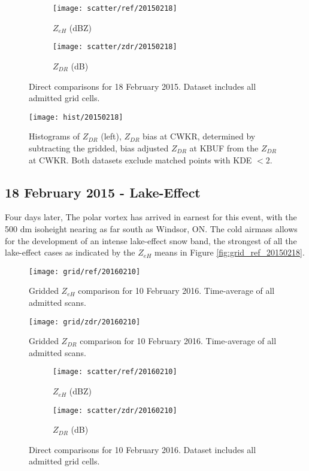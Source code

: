 \begin{figure}[p]
\centering
   \begin{subfigure}{0.49\linewidth} \centering
     \texttt{[image: scatter/ref/20150218]}
     \caption{$Z_{eH}$ (dBZ)}\label{fig:scatter_ref_20150218}
   \end{subfigure}
   \begin{subfigure}{0.49\linewidth} \centering
     \texttt{[image: scatter/zdr/20150218]}
     \caption{$Z_{DR}$ (dB)}\label{fig:scatter_zdr_20150218}
   \end{subfigure}
\caption{Direct comparisons for 18 February 2015. Dataset includes all admitted grid cells.} \label{fig:scatter_20150218}
\end{figure}

\begin{figure}[p]
\texttt{[image: hist/20150218]}\centering
\caption{Histograms of $Z_{DR}$ (left), $Z_{DR}$ bias at CWKR, determined by subtracting the gridded, bias adjusted $Z_{DR}$ at KBUF from the $Z_{DR}$ at CWKR. Both datasets exclude matched points with KDE $< 2$. } 
\label{fig:hist_20150218}
\end{figure}

\subsection{18 February 2015 - Lake-Effect}
Four days later, The polar vortex has arrived in earnest for this event, with the 500 dm isoheight nearing as far south as Windsor, ON. The cold airmass allows for the development of an intense lake-effect snow band, the strongest of all the lake-effect cases as indicated by the $Z_{eH}$ means in Figure \ref{fig:grid_ref_20150218}. 
\begin{figure}[p]
\texttt{[image: grid/ref/20160210]}
\caption{Gridded $Z_{eH}$ comparison for 10 February 2016. Time-average of all admitted scans.} 
\label{fig:grid_ref_20160210}
\end{figure}

\begin{figure}[p]
\texttt{[image: grid/zdr/20160210]}
\caption{Gridded $Z_{DR}$ comparison for 10 February 2016. Time-average of all admitted scans.} 
\label{fig:grid_zdr_20160210}
\end{figure}

\begin{figure}[p]
\centering
   \begin{subfigure}{0.49\linewidth} \centering
     \texttt{[image: scatter/ref/20160210]}
     \caption{$Z_{eH}$ (dBZ)}\label{fig:scatter_ref_20160210}
   \end{subfigure}
   \begin{subfigure}{0.49\linewidth} \centering
     \texttt{[image: scatter/zdr/20160210]}
     \caption{$Z_{DR}$ (dB)}\label{fig:scatter_zdr_20160210}
   \end{subfigure}
\caption{Direct comparisons for 10 February 2016. Dataset includes all admitted grid cells.} \label{fig:scatter_20160210}
\end{figure}

